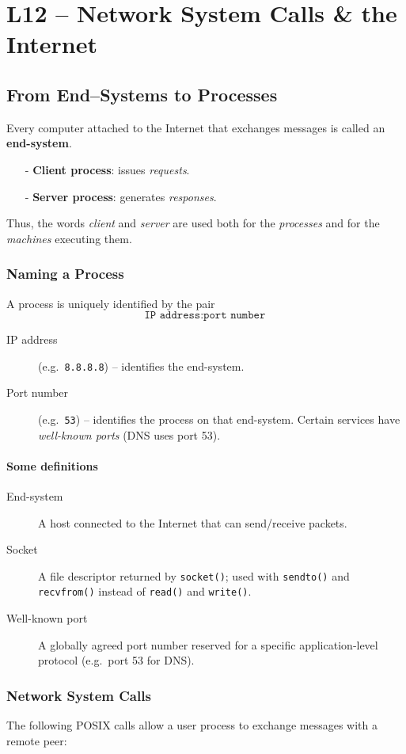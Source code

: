 \documentclass[../../compsys.tex]{subfiles}
\begin{document}
\raggedbottom
\chapter{L12 – Network System Calls \& the Internet}
\vfill
\section{From End–Systems to Processes}
Every computer attached to the Internet that exchanges messages is called an \textbf{end-system}.  
\begin{itemize}
  \item[-] \textbf{Client process}: issues \emph{requests}.  
  \item[-] \textbf{Server process}: generates \emph{responses}.  
\end{itemize}
Thus, the words \emph{client} and \emph{server} are used both for the \emph{processes} and for the \emph{machines} executing them.

\subsection{Naming a Process}
A process is uniquely identified by the pair  
\[
  \texttt{IP address} : \texttt{port number}
\]
\begin{description}
  \item[IP address] (e.g.\ \texttt{8.8.8.8}) – identifies the end-system.  
  \item[Port number] (e.g.\ \texttt{53}) – identifies the process on that end-system.  Certain services have \emph{well-known ports} (DNS uses port 53).
\end{description}
\subsubsection{Some definitions}\small
\begin{description}
  \item[End-system] A host connected to the Internet that can send/receive packets.  
  \item[Socket] A file descriptor returned by \texttt{socket()}; used with \texttt{sendto()} and \texttt{recvfrom()} instead of \texttt{read()} and \texttt{write()}.  
  \item[Well-known port] A globally agreed port number reserved for a specific application‐level protocol (e.g.\ port 53 for DNS).  
\end{description}
\newpage
\subsection{Network System Calls}
The following POSIX calls allow a user process to exchange messages with a remote peer:
\end{document}
